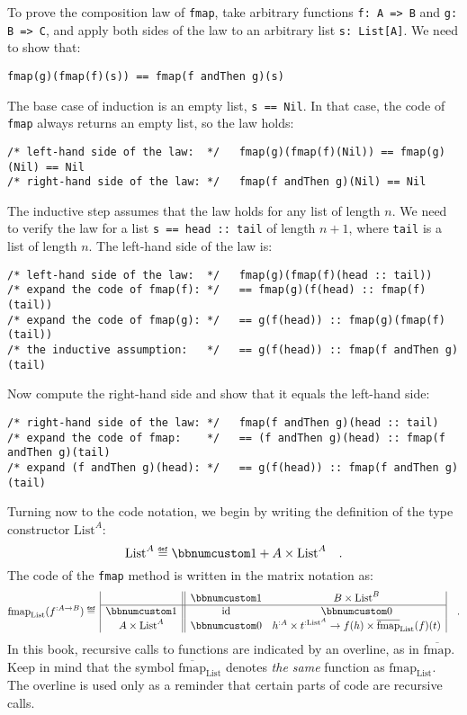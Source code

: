 To prove the composition law of \lstinline!fmap!, take arbitrary
functions \lstinline!f: A => B! and \lstinline!g: B => C!, and apply
both sides of the law to an arbitrary list \lstinline!s: List[A]!.
We need to show that:
\begin{lstlisting}
fmap(g)(fmap(f)(s)) == fmap(f andThen g)(s)
\end{lstlisting}
The base case of induction is an empty list, \lstinline!s == Nil!.
In that case, the code of \lstinline!fmap! always returns an empty
list, so the law holds:
\begin{lstlisting}
/* left-hand side of the law:  */   fmap(g)(fmap(f)(Nil)) == fmap(g)(Nil) == Nil
/* right-hand side of the law: */   fmap(f andThen g)(Nil) == Nil
\end{lstlisting}
The inductive step assumes that the law holds for any list of length
$n$. We need to verify the law for a list \lstinline!s == head :: tail!
of length $n+1$, where \lstinline!tail! is a list of length $n$.
The left-hand side of the law is:
\begin{lstlisting}
/* left-hand side of the law:  */   fmap(g)(fmap(f)(head :: tail))
/* expand the code of fmap(f): */   == fmap(g)(f(head) :: fmap(f)(tail))
/* expand the code of fmap(g): */   == g(f(head)) :: fmap(g)(fmap(f)(tail))
/* the inductive assumption:   */   == g(f(head)) :: fmap(f andThen g)(tail)
\end{lstlisting}
Now compute the right-hand side and show that it equals the left-hand
side:
\begin{lstlisting}
/* right-hand side of the law: */   fmap(f andThen g)(head :: tail)
/* expand the code of fmap:    */   == (f andThen g)(head) :: fmap(f andThen g)(tail)
/* expand (f andThen g)(head): */   == g(f(head)) :: fmap(f andThen g)(tail)
\end{lstlisting}

Turning now to the code notation, we begin by writing the definition
of the type constructor $\text{List}^{A}$:
\[
\text{List}^{A}\triangleq\bbnum 1+A\times\text{List}^{A}\quad.
\]
The code of the \lstinline!fmap! method is written in the matrix
notation as:
\[
\text{fmap}_{\text{List}}(f^{:A\rightarrow B})\triangleq\,\begin{array}{|c||cc|}
 & \bbnum 1 & B\times\text{List}^{B}\\
\hline \bbnum 1 & \text{id} & \bbnum 0\\
A\times\text{List}^{A} & \bbnum 0 & h^{:A}\times t^{:\text{List}^{A}}\rightarrow f(h)\times\overline{\text{fmap}}_{\text{List}}(f)(t)
\end{array}\quad.
\]
In this book, recursive calls to functions are indicated by an overline,
as in $\overline{\text{fmap}}$. Keep in mind that the symbol $\overline{\text{fmap}}_{\text{List}}$
denotes \emph{the same} function as $\text{fmap}_{\text{List}}$.
The overline is used only as a reminder that certain parts of code
are recursive calls.

